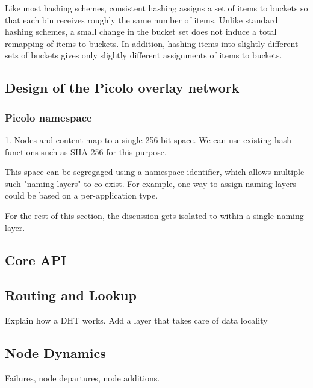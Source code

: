 
Like most hashing schemes, consistent hashing assigns a set of items to buckets so that
each bin receives roughly the same number of items.  Unlike standard hashing schemes, a small change in the bucket set
does not induce a total remapping of items to buckets. In addition, hashing items into slightly different sets of
buckets gives only slightly different assignments of items to buckets. 

\subsection{Design of the Picolo overlay network}

\subsubsection{Picolo namespace} 
1. Nodes and content map to a single 256-bit space. We can use existing hash functions such as SHA-256 for this purpose.

This space can be segregaged using a namespace identifier, which allows multiple such "naming layers" to co-exist. For example, one way to assign naming layers could be based on a per-application type.

For the rest of this section, the discussion gets isolated to within a single naming layer.

\subsection{Core API}

\subsection{Routing and Lookup}
Explain how a DHT works. Add a layer that takes care of data locality

\subsection{Node Dynamics}

Failures, node departures, node additions.

